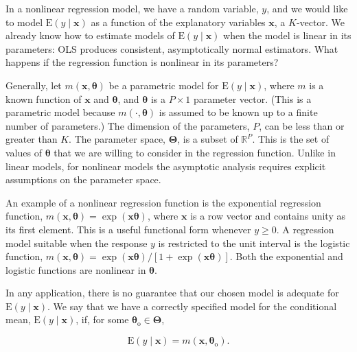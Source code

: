 \documentclass[10pt]{article}
\begin{document}
In a nonlinear regression model, we have a random variable, $y$, and we would like to model $\mathrm{E}(y \mid \mathbf{x})$ as a function of the explanatory variables $\mathbf{x}$, a $K$-vector. We already know how to estimate models of $\mathrm{E}(y \mid \mathbf{x})$ when the model is linear in its parameters: OLS produces consistent, asymptotically normal estimators. What happens if the regression function is nonlinear in its parameters?

Generally, let $m(\mathbf{x}, \boldsymbol{\theta})$ be a parametric model for $\mathrm{E}(y \mid \mathbf{x})$, where $m$ is a known function of $\mathbf{x}$ and $\boldsymbol{\theta}$, and $\boldsymbol{\theta}$ is a $P \times 1$ parameter vector. (This is a parametric model because $m(\cdot, \boldsymbol{\theta})$ is assumed to be known up to a finite number of parameters.) The dimension of the parameters, $P$, can be less than or greater than $K$. The parameter space, $\boldsymbol{\Theta}$, is a subset of $\mathbb{R}^{P}$. This is the set of values of $\boldsymbol{\theta}$ that we are willing to consider in the regression function. Unlike in linear models, for nonlinear models the asymptotic analysis requires explicit assumptions on the parameter space.

An example of a nonlinear regression function is the exponential regression function, $m(\mathbf{x}, \boldsymbol{\theta})=\exp (\mathbf{x} \boldsymbol{\theta})$, where $\mathbf{x}$ is a row vector and contains unity as its first element. This is a useful functional form whenever $y \geq 0$. A regression model suitable when the response $y$ is restricted to the unit interval is the logistic function, $m(\mathbf{x}, \boldsymbol{\theta})= \exp (\mathbf{x} \boldsymbol{\theta}) /[1+\exp (\mathbf{x} \boldsymbol{\theta})]$. Both the exponential and logistic functions are nonlinear in $\boldsymbol{\theta}$.

In any application, there is no guarantee that our chosen model is adequate for $\mathrm{E}(y \mid \mathbf{x})$. We say that we have a correctly specified model for the conditional mean, $\mathrm{E}(y \mid \mathbf{x})$, if, for some $\boldsymbol{\theta}_{\mathrm{o}} \in \boldsymbol{\Theta}$,


\begin{equation*}
\mathrm{E}(y \mid \mathbf{x})=m\left(\mathbf{x}, \boldsymbol{\theta}_{\mathrm{o}}\right) . \tag{12.1}
\end{equation*}
\end{document}
